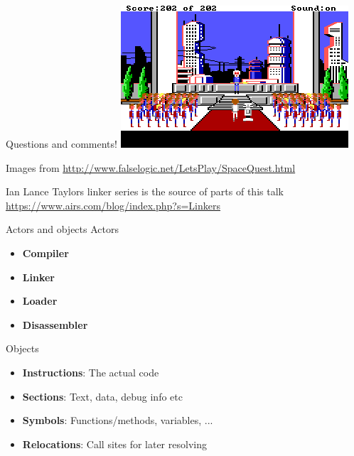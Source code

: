 \documentclass{beamer}
\begin{document}
\begin{frame}{Questions and comments!}
  \includegraphics[width=\linewidth]{sq_final}

  Images from \url{http://www.falselogic.net/LetsPlay/SpaceQuest.html}

  Ian Lance Taylors linker series is the source of parts of this talk
  \url{https://www.airs.com/blog/index.php?s=Linkers}

\end{frame}

\begin{frame}{Actors and objects}
  Actors
  \begin{itemize}
    \item \textbf{Compiler}
    \item \textbf{Linker}
    \item \textbf{Loader}
    \item \textbf{Disassembler}
  \end{itemize}
  Objects
  \begin{itemize}
    \item \textbf{Instructions}: The actual code
    \item \textbf{Sections}: Text, data, debug info etc
    \item \textbf{Symbols}: Functions/methods, variables, ...
    \item \textbf{Relocations}: Call sites for later resolving
  \end{itemize}

\end{frame}
\end{document}
